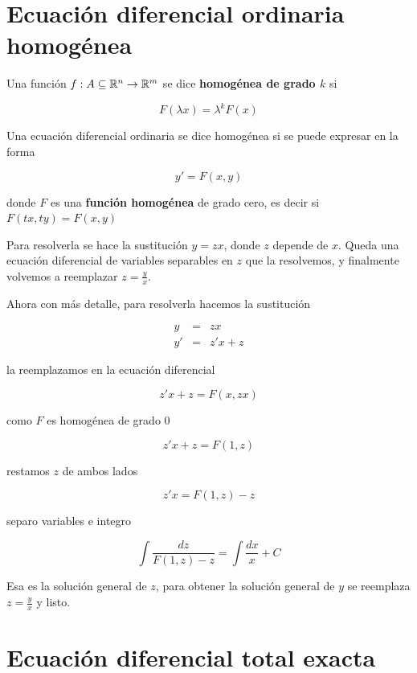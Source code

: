 \section{Ecuación diferencial ordinaria homogénea}

\begin{definition}
Una función $f : A \subseteq \mathbb{R}^n \to \mathbb{R}^m$ se dice \textbf{homogénea de grado $k$} si 

$$F(\lambda x) = \lambda^k F(x)$$
\end{definition}

\begin{definition} 
Una ecuación diferencial ordinaria se dice homogénea si se puede expresar en la forma

$$ y' = F(x,y) $$

donde $F$ es una \textbf{función homogénea} de grado cero, es decir si $F(tx, ty) = F(x,y)$
\end{definition}

Para resolverla se hace la sustitución $y=zx$, donde $z$ depende de $x$.  Queda una ecuación diferencial de variables separables en $z$ que la resolvemos, y finalmente volvemos a reemplazar $z = \frac{y}{x}$.

Ahora con más detalle, para resolverla hacemos la sustitución

\begin{eqnarray*} y &=& zx \\
y' &=& z'x + z \end{eqnarray*}

la reemplazamos en la ecuación diferencial

$$ z'x + z = F(x,zx) $$

como $F$ es homogénea de grado 0

$$z'x + z = F(1,z)$$

restamos $z$ de ambos lados

$$z' x = F(1,z) - z$$

separo variables e integro

$$ \int \frac{dz}{F(1,z) - z} = \int \frac{dx}{x} + C$$

Esa es la solución general de $z$, para obtener la solución general de $y$ se reemplaza $z = \frac{y}{x}$ y listo.

\section{Ecuación diferencial total exacta}

